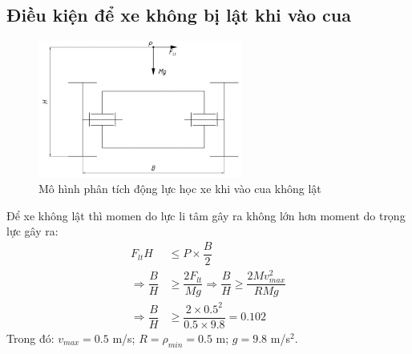         \subsection{Điều kiện để xe không bị lật khi vào cua}
            \begin{figure}[H]
                \centering
                \includegraphics[width=0.6\textwidth]{pictures/chapter3/c3_p2_TurningAnalysis.png}
                \caption{Mô hình phân tích động lực học xe khi vào cua không lật}
                \label{fig:3.2}
            \end{figure}
            \hspace*{0.6cm}Để xe không lật thì momen do lực li tâm gây ra không lớn hơn moment do trọng lực gây ra:
            \begin{align}
                F_{lt}H &\leq P \times \dfrac{B}{2} \label{eq:3-5a} \\
                \Rightarrow \dfrac{B}{H} &\geq \dfrac{2F_{lt}}{Mg} \Rightarrow \dfrac{B}{H} \geq \dfrac{2Mv_{max}^2}{RMg} \label{eq:3-5b} \\ 
                \Rightarrow \dfrac{B}{H} &\geq \dfrac{2 \times 0.5^2}{0.5 \times 9.8} = 0.102 \label{eq:3-5c}
            \end{align}
            \hspace*{0.6cm}Trong đó: $v_{max} = 0.5$ m/s; $R = \rho_{min} = 0.5$ m; $g = 9.8$ m/s$^2$.
